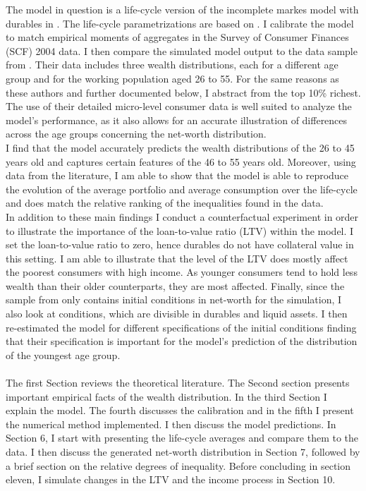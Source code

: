 \documentclass[a4paper,12pt,legno]{article}
\begin{document}
The model in question is a life-cycle version of the incomplete markes model with durables in \cite{hintermaier2010}. The life-cycle parametrizations are based on \cite{hintermaier2011}. I calibrate the model to match empirical moments of aggregates in the Survey of Consumer Finances (SCF) 2004 data. I then compare the simulated model output to the data sample from \cite{hintermaier2011}. Their data includes three wealth distributions, each for a different age group and for the working population aged 26 to 55. For the same reasons as these authors and further documented below, I abstract from the top 10\% richest. The use of their detailed micro-level consumer data is well suited to analyze the model's performance, as it also allows for an accurate illustration of differences across the age groups concerning the net-worth distribution.\\
I find that the model accurately predicts the wealth distributions of the 26 to 45 years old and captures certain features of the 46 to 55 years old. Moreover, using data from the literature, I am able to show that the model is able to reproduce the evolution of the average portfolio and average consumption over the life-cycle and does match the relative ranking of the inequalities found in the data. 
\\ 
In addition to these main findings I conduct a counterfactual experiment in order to illustrate the importance of the loan-to-value ratio (LTV) within the model. I set the loan-to-value ratio to zero, hence durables do not have collateral value in this setting. I am able to illustrate that the level of the LTV does mostly affect the poorest consumers with high income. As younger consumers tend to hold less wealth than their older counterparts, they are most affected. Finally, since the sample from \cite{hintermaier2011} only contains initial conditions in net-worth for the simulation, I also look at conditions, which are divisible in durables and liquid assets. I then re-estimated the model for different specifications of the initial conditions finding that their specification is important for the model's prediction of the distribution of the youngest age group. 
\\ \\
The first Section reviews the theoretical literature. The Second section presents important empirical facts of the wealth distribution. In the third Section I explain the model. The fourth discusses the calibration and in the fifth I present the numerical method implemented. I then discuss the model predictions. In Section 6, I start with presenting the life-cycle averages and compare them to the data. I then discuss the generated net-worth distribution in Section 7, followed by a brief section on the relative degrees of inequality. Before concluding in section eleven, I simulate changes in the LTV and the income process in Section 10.
\end{document}
